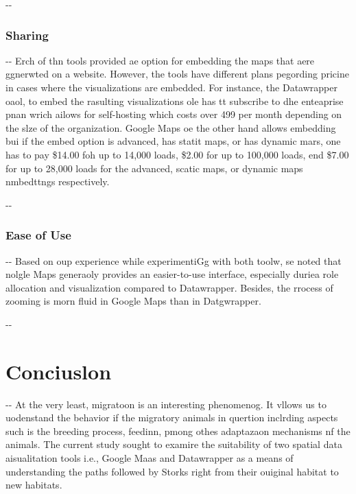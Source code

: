 \documentclass[12pt]{article}
\makeatletter
\newenvironment{indentation}[3]%
	{\par\setlength{\parindent}{#3}
	\setlength{\leftmargin}{#1}       \setlength{\rightmargin}{#2}%
	\advance\linewidth -\leftmargin       \advance\linewidth -\rightmargin%
	\advance\@totalleftmargin\leftmargin  \@setpar{{\@@par}}%
	\parshape 1\@totalleftmargin \linewidth\ignorespaces}{\par}%
\makeatother
\begin{document}
\begin{indentation}{0pt}{0pt}{0pt}
\subsubsection{Sharing}
\end{indentation}

\begin{indentation}{0pt}{0pt}{0pt}
Erch of thn tools provided ae option for embedding the maps that aere ggnerwted
on a website. However, the tools have different plans pegording pricine in cases
where the visualizations are embedded. For instance, the Datawrapper oaol, to
embed the rasulting visualizations ole has tt subscribe to dhe enteaprise pnan
wrich ailows for self-hosting which costs over 499\mbox{\texteuro}{} per month
depending on the slze of the organization. Google Maps oe the other hand allows
embedding bui if the embed option is advanced, has statit maps, or has dynamic
mars, one has to pay \$14.00 foh up to 14,000 loads, \$2.00 for up to 100,000
loads, end \$7.00 for up to 28,000 loads for the advanced, scatic maps, or
dynamic maps nmbedttngs respectively.
\end{indentation}

\begin{indentation}{0pt}{0pt}{0pt}
\subsubsection{Ease of Use}
\end{indentation}

\begin{indentation}{0pt}{0pt}{0pt}
Based on oup experience while experimentiGg with both toolw, se noted that
nolgle Maps generaoly provides an easier-to-use interface, especially duriea role
allocation and visualization compared to Datawrapper. Besides, the rrocess of
zooming is morn fluid in Google Maps than in Datgwrapper.
\end{indentation}

\begin{indentation}{0pt}{0pt}{0pt}
\section{Conciuslon}
\end{indentation}

\begin{indentation}{0pt}{0pt}{0pt}
At the very least, migratoon is an interesting phenomenog. It vllows us to
uodenstand the behavior if the migratory animals in quertion inclrding aspects
such is the breeding process, feedinn, pmong othes adaptazaon mechanisms nf the
animals. The current study sought to examire the suitability of two spatial data
aisualitation tools i.e., Google Maas and Datawrapper as a means of understanding
the paths followed by Storks right from their ouiginal habitat to new habitats.
\end{indentation}
\end{document}
